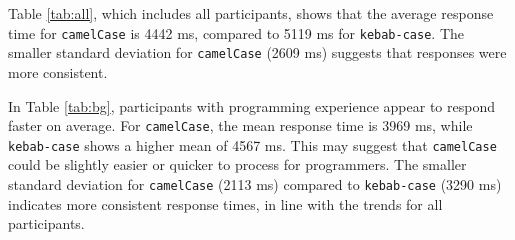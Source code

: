 \documentclass[unicode,11pt,a4paper,oneside,numbers=endperiod,openany]{scrartcl}
\begin{document}
Table \ref{tab:all}, which includes all participants, shows that the average response time for \texttt{camelCase} is 4442 ms, compared to 5119 ms for \texttt{kebab-case}. The smaller standard deviation for \texttt{camelCase} (2609 ms) suggests that responses were more consistent. \\


\begin{table}[h!]
    \centering
    \caption{Descriptive Statistics of Participants with a Programming Background}
    \label{tab:bg}
    {
    }
\end{table}

In Table \ref{tab:bg}, participants with programming experience appear to respond faster on average. For \texttt{camelCase}, the mean response time is 3969 ms, while \texttt{kebab-case} shows a higher mean of 4567 ms. This may suggest that \texttt{camelCase} could be slightly easier or quicker to process for programmers. The smaller standard deviation for \texttt{camelCase} (2113 ms) compared to \texttt{kebab-case} (3290 ms) indicates more consistent response times, in line with the trends for all participants. 
\\

\begin{table}[h!]
    \centering
    \caption{Descriptive Statistics of Participants without a Programming Background}
    \label{tab:nobg}
    { }
\end{table}
\end{document}
